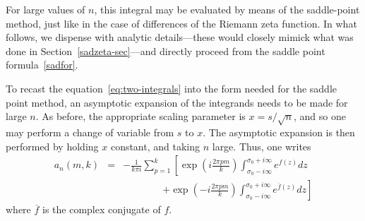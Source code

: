 \documentclass{amsart}
\begin{document}
For large values of $n$, this integral may be evaluated by means
of the saddle-point method, just like in the case of
differences of the Riemann zeta function.
% 
In what follows, we dispense with analytic details---these would
closely mimick what was done in Section~\ref{sadzeta-sec}---and directly proceed  
from the saddle point formula~\eqref{sadfor}.


To recast the equation~\eqref{eq:two-integrals} into the form needed
for the saddle point method, an asymptotic expansion of the
integrands needs to be made for large $n$. 
As before, the appropriate scaling parameter is $x=s/\sqrt{n}$,
and so one may perform a change of variable from $s$ to $x$. The asymptotic
expansion is then performed by holding $x$ constant, and taking $n$
large. Thus, one writes 
\begin{eqnarray}
a_{n}(m,k) & = & -\frac{1}{k\pi i}\sum_{p=1}^{k}
\left[\exp\left(i\frac{2\pi pm}{k}\right)
\int_{\sigma_{0}-i\infty}^{\sigma_{0}+i\infty}e^{f(z)}dz\right.
\label{eq:saddle}\\
 &  & \qquad \qquad \left.+\exp\left(-i\frac{2\pi pm}{k}\right)
\int_{\sigma_{0}-i\infty}^{\sigma_{0}+i\infty}
e^{\overline{f}(z)}dz\right]
\end{eqnarray}
 where $\overline{f}$ is the complex conjugate of $f$. 
\end{document}
